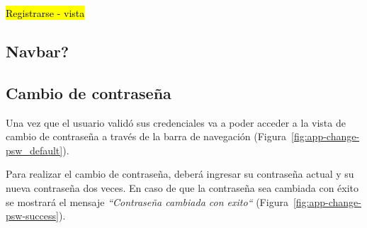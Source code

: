 \hl{Registrarse - vista}
\subsection{Navbar?}

\subsection{Cambio de contraseña}
Una vez que el usuario validó sus credenciales va a poder acceder a la vista de cambio de contraseña a través de la barra de navegación (Figura~\ref{fig:app-change-psw_default}).



Para realizar el cambio de contraseña, deberá ingresar su contraseña actual y su nueva contraseña dos veces.
En caso de que la contraseña sea cambiada con éxito se mostrará el mensaje \textit{“Contraseña cambiada con exito“} (Figura~\ref{fig:app-change-psw-success}).


